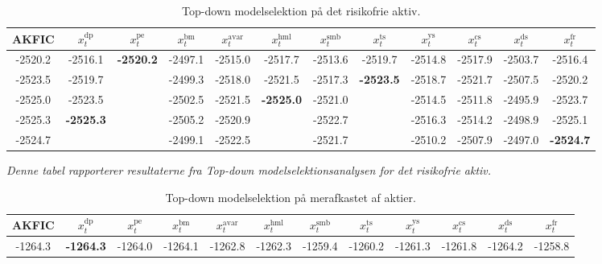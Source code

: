 \documentclass[
  a4paper,
  oneside]{memoir}
\begin{document}
\begin{landscape}
\begin{table}[H]

\caption{\label{tab:STEP-RF-TABLE}Top-down modelselektion på det risikofrie aktiv.}
\centering
\begin{threeparttable}
\begin{tabular}[t]{cccccccccccc}
\toprule
AKFIC & $x_t^{\text{dp}}$ & $x_t^{\text{pe}}$ & $x_t^{\text{bm}}$ & $x_t^{\text{avar}}$ & $x_t^{\text{hml}}$ & $x_t^{\text{smb}}$ & $x_t^{\text{ts}}$ & $x_t^{\text{ys}}$ & $x_t^{\text{cs}}$ & $x_t^{\text{ds}}$ & $x_t^{\text{fr}}$\\
\midrule
\rowcolor{gray!6}  -2520.2 & -2516.1 & \textbf{-2520.2} & -2497.1 & -2515.0 & -2517.7 & -2513.6 & -2519.7 & -2514.8 & -2517.9 & -2503.7 & -2516.4\\
 
-2523.5 & -2519.7 &  & -2499.3 & -2518.0 & -2521.5 & -2517.3 & \textbf{-2523.5} & -2518.7 & -2521.7 & -2507.5 & -2520.2\\
 
\rowcolor{gray!6}  -2525.0 & -2523.5 &  & -2502.5 & -2521.5 & \textbf{-2525.0} & -2521.0 &  & -2514.5 & -2511.8 & -2495.9 & -2523.7\\
 
-2525.3 & \textbf{-2525.3} &  & -2505.2 & -2520.9 &  & -2522.7 &  & -2516.3 & -2514.2 & -2498.9 & -2525.1\\
 
\rowcolor{gray!6}  -2524.7 &  &  & -2499.1 & -2522.5 &  & -2521.7 &  & -2510.2 & -2507.9 & -2497.0 & \textbf{-2524.7}\\
\bottomrule
\end{tabular}
\begin{tablenotes}
\item \textit{Denne tabel rapporterer resultaterne fra \textit{Top-down} modelselektionsanalysen for det risikofrie aktiv.}
\end{tablenotes}
\end{threeparttable}
\end{table}

\begin{table}[H]

\caption{\label{tab:STEP-AKT-TABLE}Top-down modelselektion på merafkastet af aktier.}
\centering
\begin{threeparttable}
\begin{tabular}[t]{cccccccccccc}
\toprule
AKFIC & $x_t^{\text{dp}}$ & $x_t^{\text{pe}}$ & $x_t^{\text{bm}}$ & $x_t^{\text{avar}}$ & $x_t^{\text{hml}}$ & $x_t^{\text{smb}}$ & $x_t^{\text{ts}}$ & $x_t^{\text{ys}}$ & $x_t^{\text{cs}}$ & $x_t^{\text{ds}}$ & $x_t^{\text{fr}}$\\
\midrule
\rowcolor{gray!6}  -1264.3 & \textbf{-1264.3} & -1264.0 & -1264.1 & -1262.8 & -1262.3 & -1259.4 & -1260.2 & -1261.3 & -1261.8 & -1264.2 & -1258.8\\
 

\end{tabular}
\end{threeparttable}
\end{table}
\end{landscape}
\end{document}
